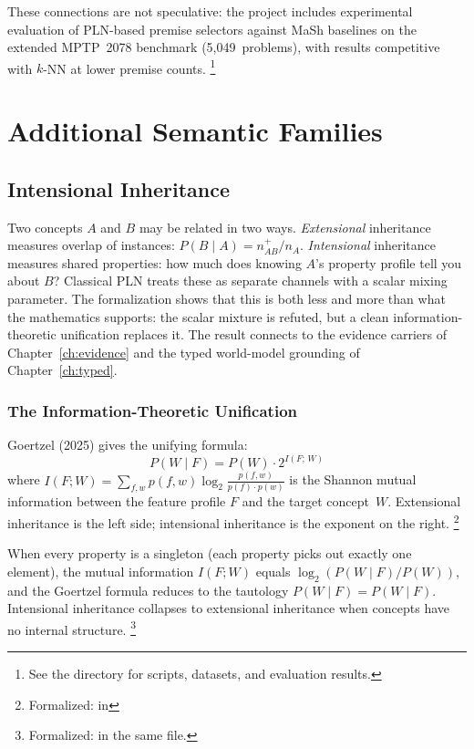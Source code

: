 \documentclass[11pt,openany]{report}
\begin{document}
\noindent
These connections are not speculative: the project includes
experimental evaluation of PLN-based premise selectors against MaSh
baselines on the extended MPTP~2078 benchmark (5,049~problems), with results
competitive with $k$-NN at lower premise counts.%
\footnote{See the  directory for scripts,
datasets, and evaluation results.}


\part{Additional Semantic Families}
\label{part:families}

\chapter{Intensional Inheritance}
\label{ch:intensional}

Two concepts $A$ and $B$ may be related in two ways.
\emph{Extensional} inheritance measures overlap of instances:
$P(B \mid A) = n_{AB}^+ / n_A$.  \emph{Intensional} inheritance
measures shared properties: how much does knowing $A$'s property
profile tell you about $B$?  Classical PLN treats these as separate
channels with a scalar mixing parameter.  The formalization shows
that this is both less and more than what the mathematics supports:
the scalar mixture is refuted, but a clean information-theoretic
unification replaces it.  The result connects to the evidence
carriers of Chapter~\ref{ch:evidence} and the typed world-model
grounding of Chapter~\ref{ch:typed}.


\section{The Information-Theoretic Unification}

Goertzel (2025) gives the unifying formula:
\[
  P(W \mid F) = P(W) \cdot 2^{I(F;\,W)}
\]
where $I(F; W) = \sum_{f,w} p(f,w) \log_2 \frac{p(f,w)}{p(f) \cdot
p(w)}$ is the Shannon mutual information between the feature profile
$F$ and the target concept~$W$.  Extensional inheritance is the left
side; intensional inheritance is the exponent on the right.%
\footnote{Formalized:
 in
}

\begin{theorem}
\label{thm:singleton-reduction}
When every property is a singleton (each property picks out exactly
one element), the mutual information $I(F; W)$ equals
$\log_2(P(W \mid F) / P(W))$, and the Goertzel formula reduces to
the tautology $P(W \mid F) = P(W \mid F)$.  Intensional inheritance
collapses to extensional inheritance when concepts have no internal
structure.%
\footnote{Formalized:  in the same file.}
\end{theorem}
\end{document}
